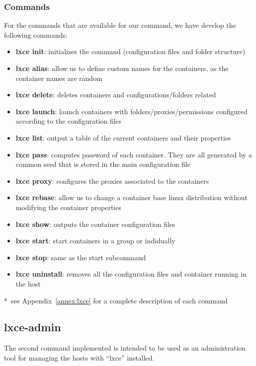 \subsubsection{Commands}
For the commands that are available for our command, we have develop the following commands:
\begin{itemize}
	\item{\textbf{lxce init}: initializes the command (configuration files and folder structure)                         }
	\item{\textbf{lxce alias}: allow us to define custom names for the containers, as the container names are random}
	\item{\textbf{lxce delete}: deletes containers and configurations/folders related}
	\item{\textbf{lxce launch}: launch containers with folders/proxies/permissions configured according to the configuration files                               }
	\item{\textbf{lxce list}: output a table of the current containers and their properties}
	\item{\textbf{lxce pass}: computes password of each container. They are all generated by a common seed that is stored in the main configuration file}
	\item{\textbf{lxce proxy}: configures the proxies associated to the containers }
	\item{\textbf{lxce rebase}: allow us to change a container base linux distribution without modifying the container properties}
	\item{\textbf{lxce show}: outputs the container configuration files }
	\item{\textbf{lxce start}: start containers in a group or indidually}
	\item{\textbf{lxce stop}: same as the start subcommand                                 }
	\item{\textbf{lxce uninstall}: removes all the configuration files and container running in the host }
\end{itemize}
*~see Appendix~\ref{annex:lxce} for a complete description of each command

\newpage
\subsection{lxce-admin}
The second command implemented is intended to be used as an administration tool for managing the hosts with ``lxce'' installed.  

